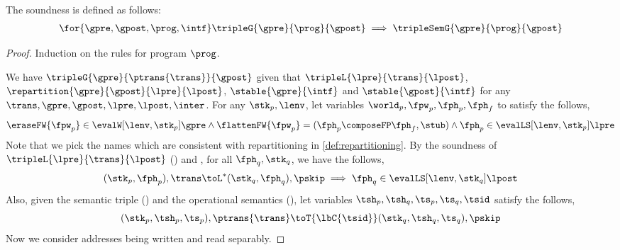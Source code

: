 \begin{defn}
\label{def:rg-semantics}

\end{defn}

\begin{thm}[Soundness]
The soundness is defined as follows:
\[
    \begin{array}{@{}l@{}}
        \for{\gpre, \gpost, \prog, \intf } \tripleG{\gpre}{\prog}{\gpost} \implies \tripleSemG{\gpre}{\prog}{\gpost}
    \end{array}
\]
\end{thm}
\begin{proof}
Induction on the rules for program \( \prog \).

We have \( \tripleG{\gpre}{\ptrans{\trans}}{\gpost} \) given that \( \tripleL{\lpre}{\trans}{\lpost} \), \( \repartition{\gpre}{\gpost}{\lpre}{\lpost} \), \( \stable{\gpre}{\intf} \) and \( \stable{\gpost}{\intf} \) for any \( \trans, \gpre, \gpost, \lpre, \lpost, \inter \). 
For any \( \stk_{p}, \lenv \), let variables \( \world_{p}, \fpw_{p}, \fph_{p}, \fph_{f} \) to satisfy the follows,
\begin{equation}
    \label{equ:def-wwhh}
    \eraseFW{\fpw_{p}} \in \evalW[\lenv, \stk_{p}]{\gpre} 
    \land \flattenFW{\fpw_{p}} = (\fph_{p} \composeFP \fph_{f}, \stub)
    \land \fph_{p} \in \evalLS[\lenv, \stk_{p}]{\lpre}
\end{equation}
Note that we pick the names which are consistent with repartitioning in  \ref{def:repartitioning}.
By the soundness of \( \tripleL{\lpre}{\trans}{\lpost} \) () and , for all \( \fph_{q}, \stk_{q} \), we have the follows,
\begin{equation}
    \label{equ:transaction-soundness}
    (\stk_{p}, \fph_{p} ), \trans \toL^{*}  (\stk_{q}, \fph_{q} ), \pskip 
    \implies \fph_{q} \in \evalLS[\lenv, \stk_{q}]{\lpost}
\end{equation}
Also, given the semantic triple () and the operational semantics (), let variables \( \tsh_{p}, \tsh_{q}, \ts_{p}, \ts_{q}, \tsid \) satisfy the follows,
\begin{equation}
    \label{equ:commit-current-trans}
    (\stk_{p}, \tsh_{p}, \ts_{p}), \ptrans{\trans} \toT{\lbC{\tsid}} (\stk_{q}, \tsh_{q}, \ts_{q}), \pskip 
\end{equation}
Now we consider addresses being written and read separably.

\end{proof}
